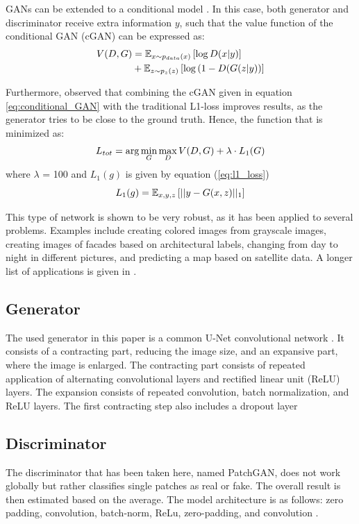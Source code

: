 GANs can be extended to a conditional model \citep{mirza2014conditional}. In this case, both generator and discriminator receive extra information $y$, such that the value function of the conditional GAN (cGAN) can be expressed as:
\begin{equation}
	\centering
	\begin{aligned}
		V(D, G) &= \mathbb{E}_{x \sim p_{data}(x)} \left[ \log D(x|y) \right] \\
		&+ \mathbb{E}_{z \sim p_{z}(z)} \left[ \log \left( 1-D(G(z|y) \right) \right]
	\end{aligned}
	\label{eq:conditional_GAN}
\end{equation}

Furthermore, \citep{isola2017image} observed that combining the cGAN given in equation \ref{eq:conditional_GAN} with the traditional L1-loss improves results, as the generator tries to be close to the ground truth. Hence, the function that is minimized as:
\begin{equation}
	\centering
	L_{tot} = \arg \min_{G} \max_{D} V(D, G) + \lambda \cdot L_1(G)
	\label{eq:total_gen_loss}
\end{equation}
where $\lambda$ = 100 and $L_1(g)$ is given by equation (\ref{eq:l1_loss})
\begin{equation}
	\centering
	L_1(g) = \mathbb{E}_{x,y,z} \left[ ||{y - G(x,z)}||_1 \right]
	\label{eq:l1_loss}
\end{equation}

This type of network is shown to be very robust, as it has been applied to several problems. Examples include creating colored images from grayscale images, creating images of facades based on architectural labels, changing from day to night in different pictures, and predicting a map based on satellite data. A longer list of applications is given in \citep{isola2017image}. 


\subsection{Generator}
The used generator in this paper is a common U-Net convolutional network \citep{ronneberger2015u}. It consists of a contracting part, reducing the image size, and an expansive part, where the image is enlarged. The contracting part consists of repeated application of alternating convolutional layers and rectified linear unit (ReLU) layers. The expansion consists of repeated convolution, batch normalization, and ReLU layers. The first contracting step also includes a dropout layer \citep{isola2017image} 

\subsection{Discriminator}
The discriminator that has been taken here, named PatchGAN, does not work globally but rather classifies single patches as real or fake. The overall result is then estimated based on the average. The model architecture is as follows: zero padding, convolution, batch-norm, ReLu, zero-padding, and convolution \citep{isola2017image}.